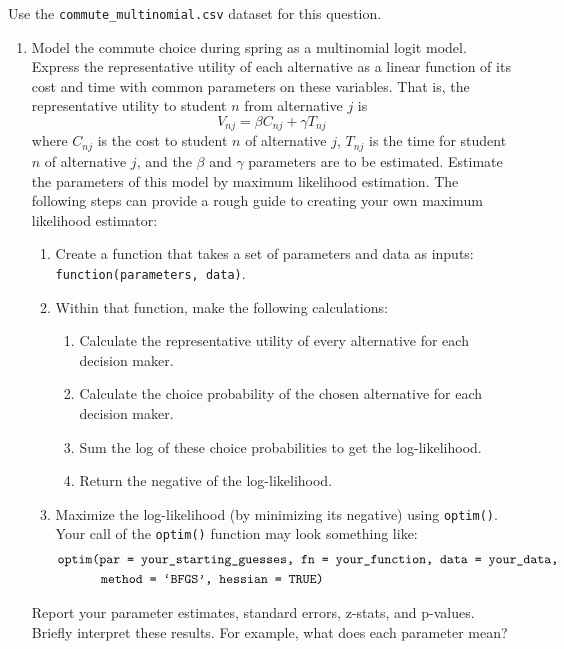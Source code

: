 \documentclass[11pt,letterpaper]{article}
\begin{document}
Use the \texttt{commute\_multinomial.csv} dataset for this question.

\begin{enumerate}[label=\alph*., leftmargin=*]
	\item Model the commute choice during spring as a multinomial logit model. Express the representative utility of each alternative as a linear function of its cost and time with common parameters on these variables. That is, the representative utility to student $n$ from alternative $j$ is
	$$V_{nj} = \beta C_{nj} + \gamma T_{nj}$$
	where $C_{nj}$ is the cost to student $n$ of alternative $j$, $T_{nj}$ is the time for student $n$ of alternative $j$, and the $\beta$ and $\gamma$ parameters are to be estimated. Estimate the parameters of this model by maximum likelihood estimation. The following steps can provide a rough guide to creating your own maximum likelihood estimator:
	\begin{enumerate}[label=\Roman*.]
		\item Create a function that takes a set of parameters and data as inputs: \texttt{function(parameters, data)}.
		\item Within that function, make the following calculations:
		\begin{enumerate}[label=\roman*.]
			\item Calculate the representative utility of every alternative for each decision maker.
			\item Calculate the choice probability of the chosen alternative for each decision maker.
			\item Sum the log of these choice probabilities to get the log-likelihood.
			\item Return the negative of the log-likelihood.
		\end{enumerate}
		\item Maximize the log-likelihood (by minimizing its negative) using \texttt{optim()}. Your call of the \texttt{optim()} function may look something like:
		\begin{align*}
			&\text{\texttt{optim(par = your\_starting\_guesses, fn = your\_function, data = your\_data,}} \\
			& \qquad \quad \; \text{\texttt{method = `BFGS', hessian = TRUE)}}
		\end{align*}
	\end{enumerate}
	Report your parameter estimates, standard errors, z-stats, and p-values. Briefly interpret these results. For example, what does each parameter mean?


\end{enumerate}
\end{document}
